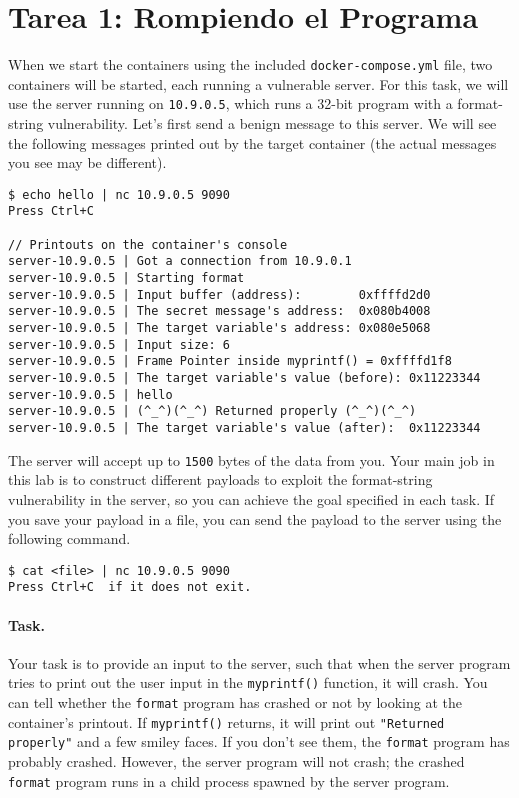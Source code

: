 \section{Tarea 1: Rompiendo el Programa}

When we start the containers using the included
\texttt{docker-compose.yml} file, two containers will be
started, each running a vulnerable server. 
For this task, we will use the server running on \texttt{10.9.0.5}, 
which runs a 32-bit program with a format-string vulnerability. 
Let's first send a benign message to this server.
We will see the following messages printed out by the target container (the
actual messages you see may be different).

\begin{lstlisting}
$ echo hello | nc 10.9.0.5 9090
Press Ctrl+C

// Printouts on the container's console
server-10.9.0.5 | Got a connection from 10.9.0.1
server-10.9.0.5 | Starting format
server-10.9.0.5 | Input buffer (address):        0xffffd2d0
server-10.9.0.5 | The secret message's address:  0x080b4008
server-10.9.0.5 | The target variable's address: 0x080e5068
server-10.9.0.5 | Input size: 6
server-10.9.0.5 | Frame Pointer inside myprintf() = 0xffffd1f8
server-10.9.0.5 | The target variable's value (before): 0x11223344
server-10.9.0.5 | hello
server-10.9.0.5 | (^_^)(^_^) Returned properly (^_^)(^_^)
server-10.9.0.5 | The target variable's value (after):  0x11223344
\end{lstlisting}
 
The server will accept up to \texttt{1500} bytes of the data from you.
Your main job in this lab is to construct different payloads to exploit the format-string 
vulnerability in the server, so you can achieve the goal specified in 
each task. If you save your payload in a file, you can send the payload
to the server using the following command.

\begin{lstlisting}
$ cat <file> | nc 10.9.0.5 9090
Press Ctrl+C  if it does not exit.
\end{lstlisting}

\paragraph{Task.} Your task is to provide an input to the server, such that
when the server program tries to print out the user input in the 
\texttt{myprintf()} function, it will crash. You can tell whether
the \texttt{format} program has crashed or not by looking at the 
container's printout.  If \texttt{myprintf()} returns, 
it will print out \texttt{"Returned properly"} and a few smiley faces.
If you don't see them, the \texttt{format} program has probably crashed.
However, the server program will not crash; the crashed \texttt{format} program
runs in a child process spawned by the server program. 


